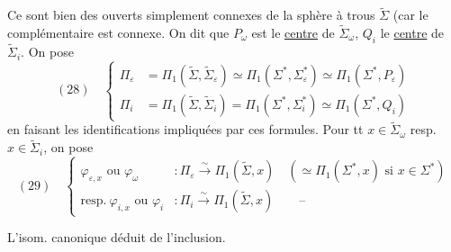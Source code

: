 Ce sont bien des ouverts   simplement connexes de la sphère à trous $\widetilde\Sigma$ (car le complémentaire est connexe. On dit que $P_\omega$ est le \uline{centre} de $\widetilde\Sigma_\omega$, $Q_i$ le \uline{centre} de $\widetilde\Sigma_i$.
On pose
\[
(28)\quad\left\{\begin{aligned}
\Pi_\varepsilon&=\Pi_1(\widetilde\Sigma,\widetilde\Sigma_\varepsilon)\simeq\Pi_1(\Sigma^*,\Sigma_\varepsilon^*)\simeq\Pi_1(\Sigma^*,P_\varepsilon)\\
\Pi_i&=\Pi_1(\widetilde\Sigma,\widetilde\Sigma_i)=\Pi_1(\Sigma^*,\Sigma_i^*)\simeq\Pi_1(\Sigma^*,Q_i)
\end{aligned}\right.
\]
en faisant les identifications impliquées par ces formules.  Pour tt $x\in\widetilde\Sigma_\omega$ resp. $x\in\widetilde\Sigma_i$, on pose
\[
(29)\quad\left\{\begin{aligned}
\varphi_{\varepsilon,x}\text{ ou }\varphi_\omega&:\Pi_\varepsilon\xrightarrow{\sim}\Pi_1(\widetilde\Sigma,x)\quad(\simeq\Pi_1(\Sigma^*,x)\text{ si }x\in\Sigma^*)\\
\text{resp.}\ \varphi_{i,x}\text{ ou }\varphi_i&:\Pi_i\xrightarrow{\sim}\Pi_1(\widetilde\Sigma,x)\qquad\text{--}
\end{aligned}\right.
\]

L'isom. canonique déduit de l'inclusion.

